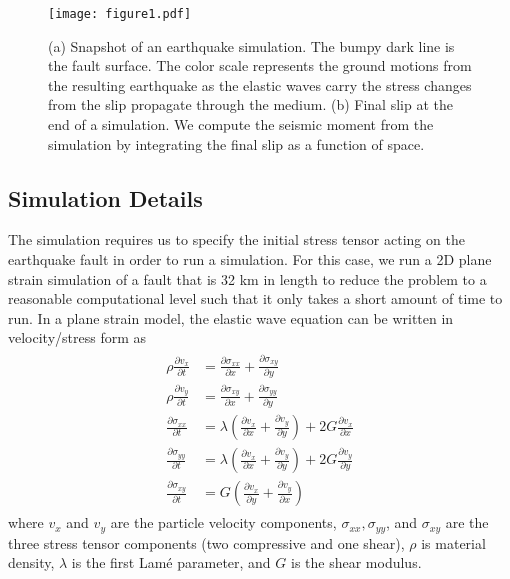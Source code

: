 \documentclass[openacc]{rstransa}%
\begin{document}
\begin{figure}[!h]
\centering\texttt{[image: figure1.pdf]}
\caption{(a) Snapshot of an earthquake simulation. The bumpy dark line is the fault surface. The color scale represents the ground motions from the resulting earthquake as the elastic waves carry the stress changes from the slip propagate through the medium. (b) Final slip at the end of a simulation. We compute the
seismic moment from the simulation by integrating the final slip as a function of space.}
\label{fig_sim}
\end{figure}

\subsection{Simulation Details}

The simulation requires us to specify the initial stress tensor acting on the earthquake fault in order to run a
simulation. For this case, we run a 2D plane strain simulation of a fault that is 32 km in length
to reduce the problem to a reasonable
computational level such that it only takes a short amount of time to run. In a plane strain model, the
elastic wave equation can be written in velocity/stress form as
\begin{align}\label{elasticwave}
\begin{split}
\rho\frac{\partial v_x}{\partial t} &= \frac{\partial \sigma_{xx}}{\partial x} + \frac{\partial \sigma_{xy}}{\partial y}\\
\rho\frac{\partial v_y}{\partial t} &= \frac{\partial \sigma_{xy}}{\partial x} + \frac{\partial \sigma_{yy}}{\partial y}\\
\frac{\partial \sigma_{xx}}{\partial t} &= \lambda\left(\frac{\partial v_x}{\partial x} + \frac{\partial v_y}{\partial y}\right) + 2G \frac{\partial v_x}{\partial x}\\
\frac{\partial \sigma_{yy}}{\partial t} &= \lambda\left(\frac{\partial v_x}{\partial x} + \frac{\partial v_y}{\partial y}\right) + 2G \frac{\partial v_y}{\partial y}\\
\frac{\partial \sigma_{xy}}{\partial t} &= G \left(\frac{\partial v_x}{\partial y} + \frac{\partial v_y}{\partial x} \right)
\end{split}
\end{align}
where $v_x$ and $v_y$ are the particle velocity components, $\sigma_{xx}, \sigma_{yy}$, and $\sigma_{xy}$
are the three stress tensor components (two compressive and one shear), $\rho$ is material
density, $\lambda$ is the first Lam\'{e} parameter, and $G$ is the shear modulus.
\end{document}
